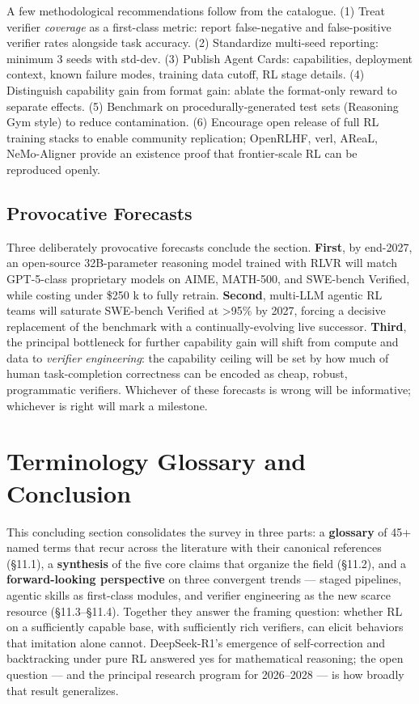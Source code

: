 A few methodological recommendations follow from the catalogue. (1) Treat verifier \emph{coverage} as a first-class metric: report false-negative and false-positive verifier rates alongside task accuracy. (2) Standardize multi-seed reporting: minimum 3 seeds with std-dev. (3) Publish Agent Cards: capabilities, deployment context, known failure modes, training data cutoff, RL stage details. (4) Distinguish capability gain from format gain: ablate the format-only reward to separate effects. (5) Benchmark on procedurally-generated test sets (Reasoning Gym style) to reduce contamination. (6) Encourage open release of full RL training stacks to enable community replication; OpenRLHF, verl, AReaL, NeMo-Aligner provide an existence proof that frontier-scale RL can be reproduced openly.

\subsection{Provocative Forecasts}\label{provocative-forecasts}

Three deliberately provocative forecasts conclude the section. \textbf{First}, by end-2027, an open-source 32B-parameter reasoning model trained with RLVR will match GPT-5-class proprietary models on AIME, MATH-500, and SWE-bench Verified, while costing under \$250 k to fully retrain. \textbf{Second}, multi-LLM agentic RL teams will saturate SWE-bench Verified at \textgreater95\% by 2027, forcing a decisive replacement of the benchmark with a continually-evolving live successor. \textbf{Third}, the principal bottleneck for further capability gain will shift from compute and data to \emph{verifier engineering}: the capability ceiling will be set by how much of human task-completion correctness can be encoded as cheap, robust, programmatic verifiers. Whichever of these forecasts is wrong will be informative; whichever is right will mark a milestone.

\section{Terminology Glossary and Conclusion}\label{terminology-glossary-and-conclusion}

This concluding section consolidates the survey in three parts: a \textbf{glossary} of 45+ named terms that recur across the literature with their canonical references (§11.1), a \textbf{synthesis} of the five core claims that organize the field (§11.2), and a \textbf{forward-looking perspective} on three convergent trends --- staged pipelines, agentic skills as first-class modules, and verifier engineering as the new scarce resource (§11.3--§11.4). Together they answer the framing question: whether RL on a sufficiently capable base, with sufficiently rich verifiers, can elicit behaviors that imitation alone cannot. DeepSeek-R1's emergence of self-correction and backtracking under pure RL answered yes for mathematical reasoning; the open question --- and the principal research program for 2026--2028 --- is how broadly that result generalizes.

